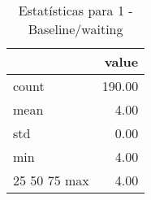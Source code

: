 \begin{table}[htbp]
\caption{Estatísticas para 1 - Baseline/waiting}
\label{tab:1_-_baseline_waiting_summary}
\begin{tabular}{lr}
\toprule
 & value \\
\midrule
count & 190.00 \\
mean & 4.00 \\
std & 0.00 \\
min & 4.00 \\
25%
50%
75%
max & 4.00 \\
\bottomrule
\end{tabular}
\end{table}
